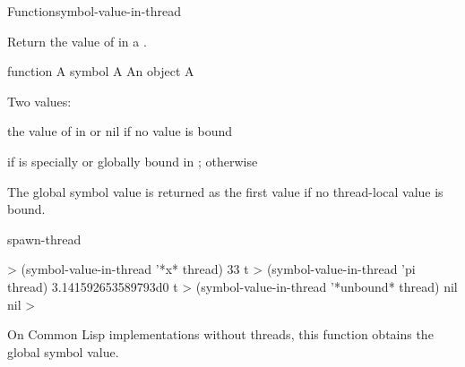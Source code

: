\begin{functiondoc}{Function}{symbol-value-in-thread}{
    \returns{} }
%
%

\fnsyntax

\fnpurpose Return the value of  in a .

\fnpackage {}

\fnmodule {}

\fnargs
\begin{args}{function}
\arg[symbol] A symbol
\arg[thread] A 
\arg[object] An object
\arg[boundp] A 
\end{args}

\fnreturns Two values:
\begin{tightitemize}
\item the value of  in  or nil if no value
  is bound
\item {} if  is specially or globally bound in 
  ; otherwise \nil
\end{tightitemize}
  
\fndescription The global symbol value is returned as the first value if no
thread-local value is bound.

\begin{alsos}{spawn-thread}
\end{alsos}

\fnexamples
%
\W\supp
\begin{example}
  > (symbol-value-in-thread '*x* thread)
  33
  t
  > (symbol-value-in-thread 'pi thread)
  3.141592653589793d0
  t
  > (symbol-value-in-thread '*unbound* thread)
  nil
  nil
  >
\end{example}

\fnnote On Common Lisp implementations without threads, this function obtains
the global symbol value.

\end{functiondoc}


